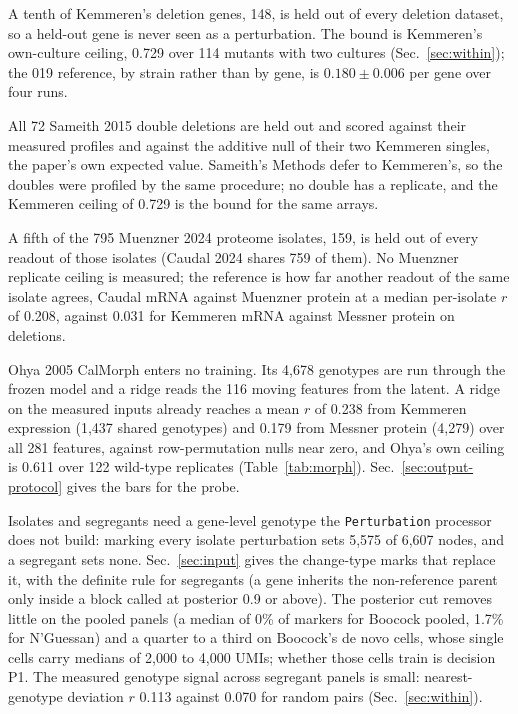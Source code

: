 A tenth of Kemmeren's deletion genes, 148, is held out of every deletion dataset, so a
held-out gene is never seen as a perturbation. The bound is Kemmeren's own-culture
ceiling, 0.729 over 114 mutants with two cultures (Sec.~\ref{sec:within}); the 019
reference, by strain rather than by gene, is $0.180 \pm 0.006$ per gene over four runs.

All 72 Sameith 2015 double deletions are held out and scored against their measured
profiles and against the additive null of their two Kemmeren singles, the paper's own
expected value. Sameith's Methods defer to Kemmeren's, so the doubles were profiled by
the same procedure; no double has a replicate, and the Kemmeren ceiling of 0.729 is the
bound for the same arrays.

A fifth of the 795 Muenzner 2024 proteome isolates, 159, is held out of every readout of
those isolates (Caudal 2024 shares 759 of them). No Muenzner replicate ceiling is
measured; the reference is how far another readout of the same isolate agrees, Caudal
mRNA against Muenzner protein at a median per-isolate $r$ of 0.208, against 0.031 for
Kemmeren mRNA against Messner protein on deletions.

Ohya 2005 CalMorph enters no training. Its 4{,}678 genotypes are run through the frozen
model and a ridge reads the 116 moving features from the latent. A ridge on the measured
inputs already reaches a mean $r$ of 0.238 from Kemmeren expression (1{,}437 shared
genotypes) and 0.179 from Messner protein (4{,}279) over all 281 features, against
row-permutation nulls near zero, and Ohya's own ceiling is 0.611 over 122 wild-type
replicates (Table~\ref{tab:morph}). Sec.~\ref{sec:output-protocol} gives the bars for the
probe.

Isolates and segregants need a gene-level genotype the \texttt{Perturbation} processor
does not build: marking every isolate perturbation sets 5{,}575 of 6{,}607 nodes, and a
segregant sets none. Sec.~\ref{sec:input} gives the change-type marks that replace it,
with the definite rule for segregants (a gene inherits the non-reference parent only
inside a block called at posterior 0.9 or above). The posterior cut removes little on the
pooled panels (a median of 0\% of markers for Boocock pooled, 1.7\% for N'Guessan) and a
quarter to a third on Boocock's de novo cells, whose single cells carry medians of 2{,}000
to 4{,}000 UMIs; whether those cells train is decision P1. The measured genotype signal
across segregant panels is small: nearest-genotype deviation $r$ 0.113 against 0.070
for random pairs (Sec.~\ref{sec:within}).

